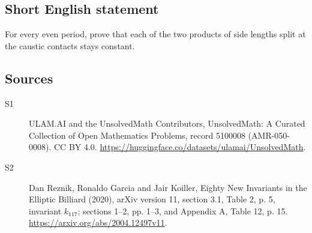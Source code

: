 \documentclass[11pt]{article}
\begin{document}
\subsection{Short English statement}
For every even period, prove that each of the two products of side lengths split at the caustic contacts stays constant.
\subsection{Sources}
\begin{description}
\item[\hypertarget{source:5100008:1}{S1}] ULAM.AI and the UnsolvedMath Contributors, UnsolvedMath: A Curated Collection of Open Mathematics Problems, record 5100008 (AMR-050-0008). CC BY 4.0. \url{https://huggingface.co/datasets/ulamai/UnsolvedMath}.
\item[\hypertarget{source:5100008:2}{S2}] Dan Reznik, Ronaldo Garcia and Jair Koiller, Eighty New Invariants in the Elliptic Billiard (2020), arXiv version 11, section 3.1, Table 2, p. 5, invariant $k_{117}$; sections 1--2, pp. 1--3, and Appendix A, Table 12, p. 15. \url{https://arxiv.org/abs/2004.12497v11}.
\end{description}
\label{end:5100008}
\end{document}
